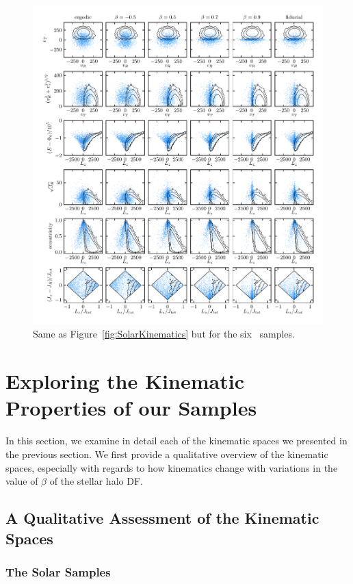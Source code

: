 \begin{figure}
	\centering
	\includegraphics[width=\textwidth]{figure/ch2/SurveyKinematicsGrid.pdf}
	\caption{Same as Figure~\ref{fig:SolarKinematics} but for the six \survey\ samples.}
	\label{fig:SurveyKinematics}
\end{figure}

\section{Exploring the Kinematic Properties of our Samples}

In this section, we examine in detail each of the kinematic spaces we presented in the previous section. We first provide a qualitative overview of the kinematic spaces, especially with regards to how kinematics change with variations in the value of $\beta$ of the stellar halo DF. 

\subsection{A Qualitative Assessment of the Kinematic Spaces}

\subsubsection{The Solar Samples}

